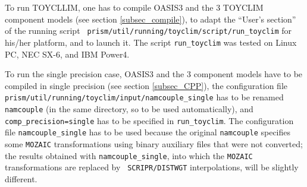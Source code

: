 To run TOYCLLIM, one has to compile OASIS3 and the 3 TOYCLIM component
models (see section \ref{subsec_compile}), to adapt the ``User's
section'' of the running script {\tt
  prism/util/running/toyclim/script/\break run\_toyclim} for his/her
platform, and to launch it.  The script {\tt run\_toyclim} was tested
on Linux PC, NEC SX-6, and IBM Power4.

To run the single precision case, OASIS3 and the 3 component models
have to be compiled in single precision (see section
\ref{subsec_CPP}), the configuration file {\tt
  prism/util/running/toyclim/input/\break namcouple\_single} has to be
renamed {\tt namcouple} (in the same directory, so to be used
automatically), and {\tt comp\_precision=single} has to be specified
in {\tt run\_toyclim}. The configuration file {\tt namcouple\_single}
has to be used because the original {\tt namcouple} specifies some
{\tt MOZAIC} transformations using binary auxiliary files that were
not converted; the results obtained with {\tt namcouple\_single}, into
which the {\tt MOZAIC} transformations are replaced by {\tt
  SCRIPR/DISTWGT} interpolations, will be slightly different.


